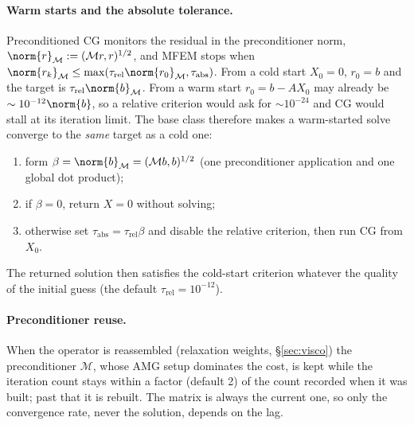 \documentclass[11pt]{article}
\numberwithin{equation}{section}
\theoremstyle{remark}
\begin{document}
\paragraph{Warm starts and the absolute tolerance.} Preconditioned CG
monitors the residual in the preconditioner norm,
$\norm{r}_{\mathcal{M}} := (\mathcal{M}r, r)^{1/2}$, and MFEM stops when
$\norm{r_k}_{\mathcal{M}} \le \max(\tau_{\mathrm{rel}}\norm{r_0}_{\mathcal{M}},
\tau_{\mathrm{abs}})$. From a cold start $X_0 = 0$, $r_0 = b$ and the
target is $\tau_{\mathrm{rel}}\norm{b}_{\mathcal{M}}$. From a warm start
$r_0 = b - AX_0$ may already be $\sim10^{-12}\norm{b}$, so a relative
criterion would ask for $\sim10^{-24}$ and CG would stall at its iteration
limit. The base class therefore makes a warm-started solve converge to the
\emph{same} target as a cold one:
\begin{enumerate}
\item form $\beta = \norm{b}_{\mathcal{M}} = (\mathcal{M}b, b)^{1/2}$ (one
  preconditioner application and one global dot product);
\item if $\beta = 0$, return $X = 0$ without solving;
\item otherwise set $\tau_{\mathrm{abs}} = \tau_{\mathrm{rel}}\beta$ and
  disable the relative criterion, then run CG from $X_0$.
\end{enumerate}
The returned solution then satisfies the cold-start criterion whatever the
quality of the initial guess (the default $\tau_{\mathrm{rel}} =
10^{-12}$).

\paragraph{Preconditioner reuse.} When the operator is reassembled
(relaxation weights, \S\ref{sec:visco}) the preconditioner $\mathcal{M}$,
whose AMG setup dominates the cost, is kept while the iteration count
stays within a factor (default 2) of the count recorded when it was built;
past that it is rebuilt. The matrix is always the current one, so only the
convergence rate, never the solution, depends on the lag.
\end{document}
